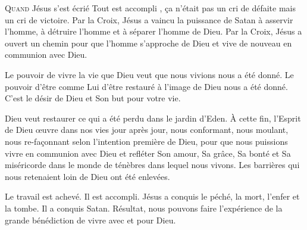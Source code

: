 \dvrule







\lettrine{Q}{uand} Jésus s'est écrié\frcolon{} 
 \Og Tout est accompli \Fg{}, \c{c}a n'était pas un cri de défaite
 mais un cri de victoire. Par la Croix, Jésus a vaincu la puissance
 de Satan à asservir l'homme, à détruire l'homme et à séparer l'homme de Dieu.
 Par la Croix, Jésus a ouvert un chemin pour que l'homme
 s'approche de Dieu et vive de nouveau en communion avec Dieu.

Le pouvoir de vivre la vie que Dieu veut que nous vivions nous a été donné.
 Le pouvoir d'être comme Lui \ocadr d'être restauré à l'image de Dieu \fcadr{}
 nous a été donné. C'est le désir de Dieu et Son but pour votre vie.


Dieu veut restaurer ce qui a été perdu dans le jardin d'Eden.
 À cette fin, l'Esprit de Dieu \oe{}uvre dans nos vies jour après jour,
 nous conformant, nous moulant, nous re-fa\c{c}onnant selon l'intention
 première de Dieu, pour que nous puissions vivre en communion avec Dieu
 et refléter Son amour, Sa grâce, Sa bonté et Sa miséricorde
 dans le monde de ténèbres dans lequel nous vivons.
 Les barrières qui nous retenaient loin de Dieu ont été enlevées.

Le travail est achevé. Il est accompli. Jésus a conquis le péché,
 la mort, l'enfer et la tombe. Il a conquis Satan. Résultat,
 nous pouvons faire l'expérience de la grande bénédiction de vivre avec et pour Dieu.

